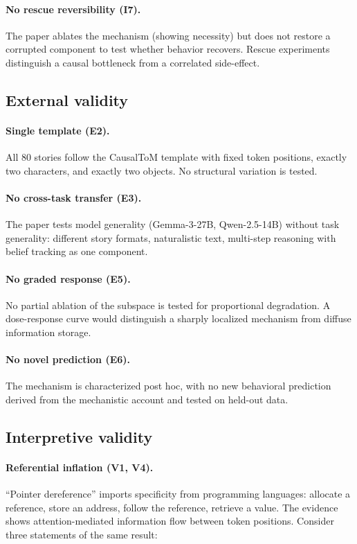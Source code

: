 \documentclass[11pt]{article}
\begin{document}
\paragraph{No rescue reversibility (I7).}
The paper ablates the mechanism (showing necessity) but does not restore a corrupted component to test whether behavior recovers. Rescue experiments distinguish a causal bottleneck from a correlated side-effect.

\subsection{External validity}

\paragraph{Single template (E2).}
All 80 stories follow the CausalToM template with fixed token positions, exactly two characters, and exactly two objects. No structural variation is tested.

\paragraph{No cross-task transfer (E3).}
The paper tests model generality (Gemma-3-27B, Qwen-2.5-14B) without task generality: different story formats, naturalistic text, multi-step reasoning with belief tracking as one component.

\paragraph{No graded response (E5).}
No partial ablation of the subspace is tested for proportional degradation. A dose-response curve would distinguish a sharply localized mechanism from diffuse information storage.

\paragraph{No novel prediction (E6).}
The mechanism is characterized post hoc, with no new behavioral prediction derived from the mechanistic account and tested on held-out data.

\subsection{Interpretive validity}

\paragraph{Referential inflation (V1, V4).}
``Pointer dereference'' imports specificity from programming languages: allocate a reference, store an address, follow the reference, retrieve a value. The evidence shows attention-mediated information flow between token positions. Consider three statements of the same result:
\end{document}

